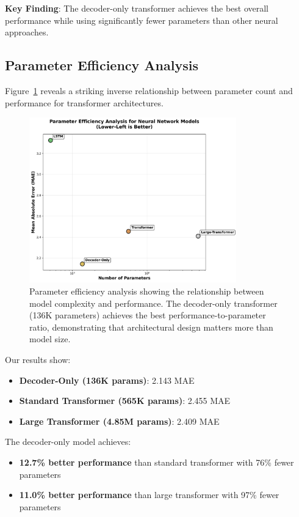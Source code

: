 \documentclass[11pt]{article}
\begin{document}
\textbf{Key Finding}: The decoder-only transformer achieves the best overall performance while using significantly fewer parameters than other neural approaches.

\subsection{Parameter Efficiency Analysis}

Figure~\ref{fig:param_efficiency} reveals a striking inverse relationship between parameter count and performance for transformer architectures.

\begin{figure}[h]
\centering
\includegraphics[width=0.8\textwidth]{../results/figure2_parameter_efficiency.png}
\caption{Parameter efficiency analysis showing the relationship between model complexity and performance. The decoder-only transformer (136K parameters) achieves the best performance-to-parameter ratio, demonstrating that architectural design matters more than model size.}
\label{fig:param_efficiency}
\end{figure}

Our results show:
\begin{itemize}
\item \textbf{Decoder-Only (136K params)}: 2.143 MAE
\item \textbf{Standard Transformer (565K params)}: 2.455 MAE  
\item \textbf{Large Transformer (4.85M params)}: 2.409 MAE
\end{itemize}

The decoder-only model achieves:
\begin{itemize}
\item \textbf{12.7\% better performance} than standard transformer with 76\% fewer parameters
\item \textbf{11.0\% better performance} than large transformer with 97\% fewer parameters
\end{itemize}
\end{document}
